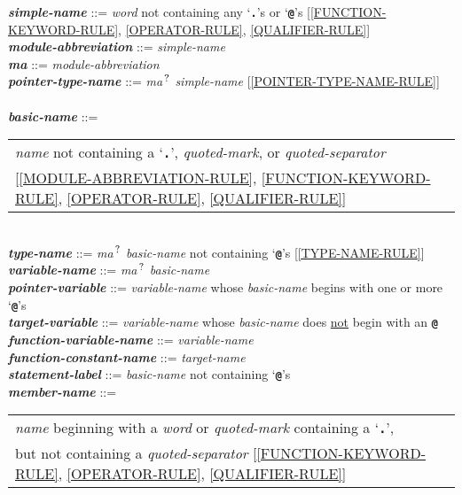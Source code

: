 \documentclass[12pt]{article}
\newcommand{\TT}[1]{{\tt \bfseries #1}}
\newcommand{\QMARK}{{$^{\,\mbox{\footnotesize ?}}$}}
\newcommand{\MA}{{\em ma}\QMARK}
\newcommand{\emkey}[1]{{\em \bfseries #1}}
\newenvironment{indpar}[1][0.3in]%
	{\begin{list}{}%
		     {\setlength{\itemsep}{0in}%
		      \setlength{\topsep}{0in}%
		      \setlength{\parsep}{1ex}%
		      \setlength{\labelwidth}{#1}%
		      \setlength{\leftmargin}{#1}%
		      \addtolength{\leftmargin}{\labelsep}}%
	 \item}%
	{\end{list}}
\begin{document}
\begin{indpar}
\emkey{simple-name} ::= {\em word} not containing any `\TT{.}'s or `\TT{@}'s
    [\ref{FUNCTION-KEYWORD-RULE},
     \ref{OPERATOR-RULE},
     \ref{QUALIFIER-RULE}] \\
\emkey{module-abbreviation}\label{MODULE-ABBREVIATION} ::= {\em simple-name} \\
\emkey{ma} ::= {\em module-abbreviation} \\
\emkey{pointer-type-name}\label{POINTER-TYPE-NAME} ::=
    \MA{} {\em simple-name}
    [\ref{POINTER-TYPE-NAME-RULE}] \\
\\[1ex]
\emkey{basic-name}\label{BASIC-NAME} ::=
	\begin{tabular}[t]{@{}l}
	{\em name} not containing a `\TT{.}', {\em quoted-mark}, or
	    {\em quoted-separator} \\{}
	[\ref{MODULE-ABBREVIATION-RULE},
	 \ref{FUNCTION-KEYWORD-RULE},
	 \ref{OPERATOR-RULE},
	 \ref{QUALIFIER-RULE}] \\
	\end{tabular} \\
\emkey{type-name}\label{TYPE-NAME} ::=
    \MA{} {\em basic-name} not containing `\TT{@}'s
	[\ref{TYPE-NAME-RULE}] \\
\emkey{variable-name}\label{VARIABLE-NAME} ::=
    \MA{} {\em basic-name} \\
\emkey{pointer-variable}\label{POINTER-VARIABLE} ::=
    {\em variable-name} whose {\em basic-name} begins with one or more
    `\TT{@}'s \\
\emkey{target-variable}\label{TARGET-VARIABLE} ::=
    {\em variable-name} whose {\em basic-name} does \underline{not}
    begin with an \TT{@} \\
\emkey{function-variable-name}\label{FUNCTION-VARIABLE-NAME} ::=
    {\em variable-name} \\
\emkey{function-constant-name}\label{FUNCTION-CONSTANT-NAME} ::=
    {\em target-name} \\
\emkey{statement-label} ::= {\em basic-name}
    \label{STATEMENT-LABEL} not containing `\TT{@}'s
\\[1ex]
\emkey{member-name}\label{MEMBER-NAME}
	::= \begin{tabular}[t]{@{}l@{}}
                        {\em name} beginning with a {\em word} or
			{\em quoted-mark} containing a `\TT{.}', \\
			but not containing a {\em quoted-separator}
			[\ref{FUNCTION-KEYWORD-RULE},
			 \ref{OPERATOR-RULE},
			 \ref{QUALIFIER-RULE}] \\

\end{tabular}
\end{indpar}
\end{document}
